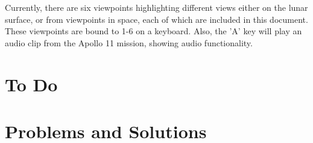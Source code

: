 \documentclass[onecolumn, draftclsnofoot,10pt, compsoc]{IEEEtran}
\begin{document}
Currently, there are six viewpoints highlighting different views either on the lunar surface, or from viewpoints in space, each of which are included in this document. These viewpoints are bound to 1-6 on a keyboard. Also, the 'A' key will play an audio clip from the Apollo 11 mission, showing audio functionality.  

\section{To Do}




\section{Problems and Solutions}
\end{document}
